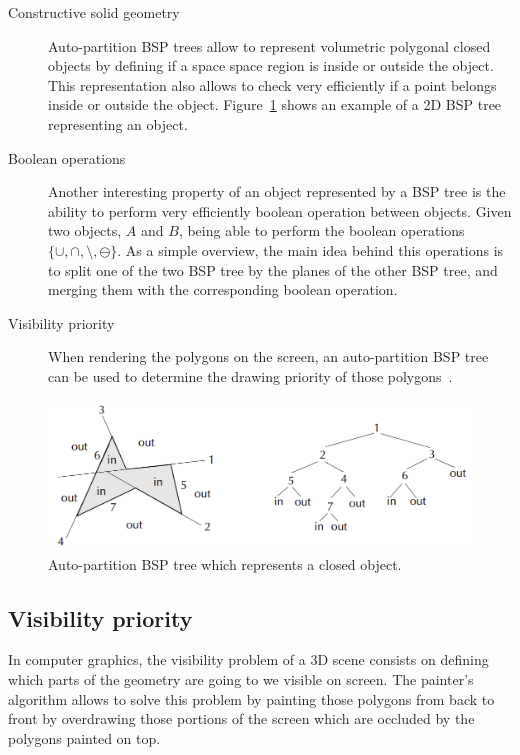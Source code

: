 \documentclass{article}
\begin{document}
\begin{description}
\item[Constructive solid geometry] Auto-partition BSP trees allow to represent volumetric polygonal closed objects by defining if a space space region is inside or outside the object. This representation also allows to check very efficiently if a point belongs inside or outside the object. Figure~\ref{object} shows an example of a 2D BSP tree representing an object.

\item[Boolean operations] Another interesting property of an object represented by a BSP tree is the ability to perform very efficiently boolean operation between objects. Given two objects, $A$ and $B$, being able to perform the boolean operations $\{\cup, \cap, \setminus, \ominus\}$. As a simple overview, the main idea behind this operations is to split one of the two BSP tree by the planes of the other BSP tree, and merging them with the corresponding boolean operation.

\item[Visibility priority] When rendering the polygons on the screen, an auto-partition BSP tree can be used to determine the drawing priority of those polygons~\cite{siggraph}.
\end{description}

\begin{figure}
\includegraphics[width=\linewidth]{bsp_tree_object.png}
\caption{Auto-partition BSP tree which represents a closed object.}
\label{object}
\end{figure}

\subsection*{Visibility priority}
In computer graphics, the visibility problem of a 3D scene consists on defining which parts of the geometry are going to we visible on screen. The painter's algorithm allows to solve this problem by painting those polygons from back to front by overdrawing those portions of the screen which are occluded by the polygons painted on top. 
\end{document}
